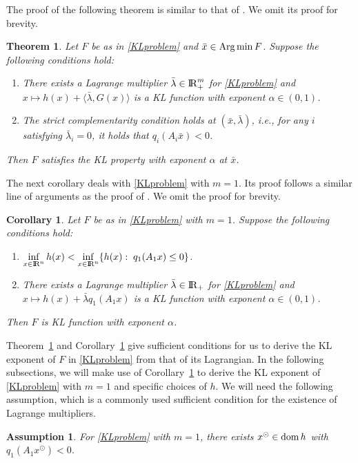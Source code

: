 \documentclass[10pt]{article}
\numberwithin{equation}{section}
\newtheorem{theorem}{Theorem}[section]
\newtheorem{corollary}{Corollary}[section]
\newtheorem{assumption}{Assumption}[section]
\def\R{{\rm I\!R}}
\def\Argmin{\mathop{\rm Arg\,min}}
\def\xfeas{x^\odot}
\def\dom{{\rm dom}\,}
\begin{document}
The proof of the following theorem is similar to that of \cite[Theorem~4.2]{YuLP20}. We omit its proof for brevity.
\begin{theorem}\label{KL}
Let $F$ be as in \eqref{KLproblem} and $\bar{x}\in\Argmin F$. Suppose the following conditions hold:
\begin{enumerate}[{\rm (i)}]
  \item There exists a Lagrange multiplier $\bar{\lambda}\in\R^m_+$ for \eqref{KLproblem} and $x\mapsto h(x) + \langle\bar{\lambda}, G(x)\rangle$ is a KL function with exponent $\alpha\in(0,1)$.
  \item The strict complementarity condition holds at $(\bar{x}, \bar{\lambda})$, i.e., for any $i$ satisfying $\bar{\lambda}_i = 0$, it holds that $q_i(A_i\bar{x}) < 0$.
 \end{enumerate}
 Then $F$ satisfies the KL property with exponent $\alpha$ at $\bar{x}$.
\end{theorem}

The next corollary deals with \eqref{KLproblem} with $m = 1$. Its proof follows a similar line of arguments as the proof of \cite[Corollary~4.3]{YuLP20}. We omit the proof for brevity.

\begin{corollary}\label{KL1}
Let $F$ be as in \eqref{KLproblem} with $m = 1$. Suppose the following conditions hold:
\begin{enumerate}[{\rm (i)}]
   \item $\inf\limits_{x\in \R^n}h(x) < \inf\limits_{x\in \R^n} \{h(x):\; q_1(A_1x)\leq 0\}$.
   \item There exists a Lagrange multiplier $\bar{\lambda}\in\R_+$ for \eqref{KLproblem} and $x\mapsto h(x) + \bar{\lambda}q_1(A_1x)$ is a KL function with exponent $\alpha\in(0,1)$.
 \end{enumerate}
 Then $F$ is KL function with exponent $\alpha$.
\end{corollary}
Theorem~\ref{KL} and Corollary~\ref{KL1} give sufficient conditions for us to derive the KL exponent of $F$ in \eqref{KLproblem} from that of its Lagrangian. In the following subsections, we will make use of Corollary~\ref{KL1} to derive the KL exponent of \eqref{KLproblem} with $m = 1$ and specific choices of $h$. We will need the following assumption, which is a commonly used sufficient condition for the existence of Lagrange multipliers.
\begin{assumption}\label{assumptionxxx}
  For \eqref{KLproblem} with $m = 1$, there exists $\xfeas\in \dom h$ with $q_1(A_1\xfeas) < 0$.
\end{assumption}
\end{document}
